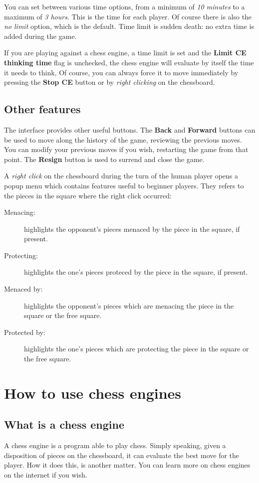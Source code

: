 \documentclass[a4paper]{article}
\begin{document}
You can set between various time options, from a minimum of \textit{10 minutes} to a maximum of \textit{3 hours}. This is the time for each player. Of course there is
also the \textit{no limit} option, which is the default. Time limit is sudden death: no extra time is added during the game.

If you are playing against a chess engine, a time limit is set and the \textbf{Limit CE thinking time} flag is unchecked, the chess engine will evaluate by itself the time
it needs to think, Of course, you can always force it to move immediately by pressing the \textbf{Stop CE} button or by \textit{right clicking} on the chessboard.


\subsection{Other features}
The interface provides other useful buttons. The \textbf{Back} and \textbf{Forward} buttons can be used to move along the history of the game, reviewing the previous moves.
You can modify your previous moves if you wish, restarting the game from that point. The \textbf{Resign} button is used to surrend and close the game.

A \textit{right click} on the chessboard during the turn of the human player opens a popup menu which contains features useful to beginner players. They refers to the pieces
in the square where the right click occurred:
\begin{description}
\item[Menacing:] highlights the opponent's pieces menaced by the piece in the square, if present.
\item[Protecting:] highlights the one's pieces proteced by the piece in the square, if present.
\item[Menaced by:] highlights the opponent's pieces which are menacing the piece in the square or the free square.
\item[Protected by:] highlights the one's pieces which are protecting the piece in the square or the free square.
\end{description}


\section{How to use chess engines}
\label{howce}
\subsection{What is a chess engine}
A chess engine is a program able to play chess. Simply speaking, given a disposition of pieces on the chessboard, it can evaluate the best move for the player.
How it does this, is another matter. You can learn more on chess engines on the internet if you wish.
\end{document}
